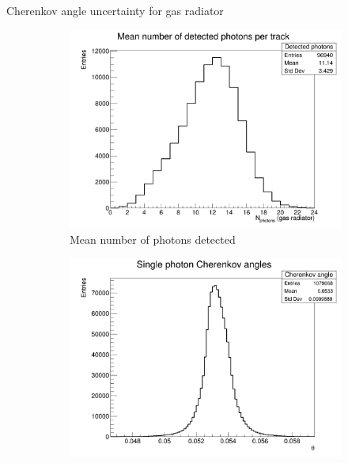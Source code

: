 \documentclass{beamer}
\begin{document}
\begin{frame}{Cherenkov angle uncertainty for gas radiator}
  \begin{figure}
    \centering
    \vspace{-0.2cm}
    \begin{subfigure}{0.35\textwidth}
      \includegraphics[width = 1.0\textwidth]{Plots/NumberDetectedPhotons_Barrel_Gas.png}
      \vspace{-0.75cm}
      \caption{Mean number of photons detected}
    \end{subfigure}
    \begin{subfigure}{0.35\textwidth}
      \includegraphics[width = 1.0\textwidth]{Plots/SinglePhotonCherenkovAngles_Barrel_Gas.png}
      \vspace{-0.75cm}

\end{subfigure}
\end{figure}
\end{frame}
\end{document}
